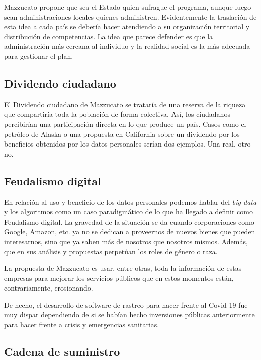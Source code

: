 \documentclass[
]{article}
\begin{document}
Mazzucato propone que sea el Estado quien sufrague el programa, aunque
luego sean administraciones locales quienes administren. Evidentemente
la traslación de esta idea a cada país se debería hacer atendiendo a su
organización territorial y distribución de competencias. La idea que
parece defender es que la administración más cercana al individuo y la
realidad social es la más adecuada para gestionar el plan.

\hypertarget{dividendo-ciudadano}{%
\subsection{Dividendo ciudadano}\label{dividendo-ciudadano}}

El Dividendo ciudadano de Mazzucato se trataría de una reserva de la
riqueza que compartiría toda la población de forma colectiva. Así, los
ciudadanos percibirían una participación directa en lo que produce un
país. Casos como el petróleo de Alaska o una propuesta en California
sobre un dividendo por los beneficios obtenidos por los datos personales
serían dos ejemplos. Una real, otro no.

\hypertarget{feudalismo-digital}{%
\subsection{Feudalismo digital}\label{feudalismo-digital}}

En relación al uso y beneficio de los datos personales podemos hablar
del \emph{big data} y los algoritmos como un caso paradigmático de lo
que ha llegado a definir como Feudalismo digital. La gravedad de la
situación se da cuando corporaciones como Google, Amazon, etc. ya no se
dedican a proveernos de nuevos bienes que pueden interesarnos, sino que
ya saben más de nosotros que nosotros mismos. Además, que en sus
análisis y propuestas perpetúan los roles de género o raza.

La propuesta de Mazzucato es usar, entre otras, toda la información de
estas empresas para mejorar los servicios públicos que en estos momentos
están, contrariamente, erosionando.

De hecho, el desarrollo de software de rastreo para hacer frente al
Covid-19 fue muy dispar dependiendo de si se habían hecho inversiones
públicas anteriormente para hacer frente a crisis y emergencias
sanitarias.

\hypertarget{cadena-de-suministro}{%
\subsection{Cadena de suministro}\label{cadena-de-suministro}}
\end{document}
